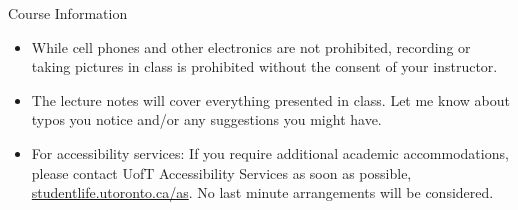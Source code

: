 \documentclass[11pt,handout,aspectratio=169]{beamer}
\begin{document}
\begin{frame}{Course Information}
  \begin{itemize}
  \item While cell phones and other electronics are not prohibited, recording or taking pictures in class is prohibited without the consent of your instructor.
  \item The lecture notes will cover everything presented in class. Let me know about typos you notice and/or any suggestions you might have.
  \item For accessibility services: If you require additional academic accommodations, please contact UofT Accessibility Services as soon as possible, \url{studentlife.utoronto.ca/as}. No last minute arrangements will be considered.   
  \end{itemize}
\end{frame}




%
%

\end{document}
